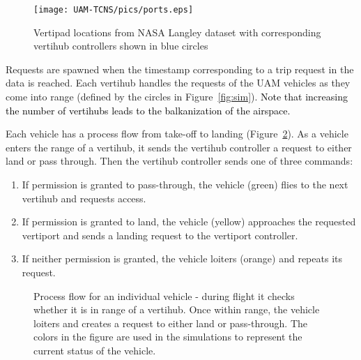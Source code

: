 \begin{figure}[h!]
	\centering
	\texttt{[image: UAM-TCNS/pics/ports.eps]}
	\caption{ Vertipad locations from NASA Langley dataset with corresponding vertihub controllers shown in blue circles}
	\label{fig:vertipadlocations}
\end{figure}


Requests are spawned when the timestamp corresponding to a trip request in the data is reached. Each vertihub handles the requests of the UAM vehicles as they come into range (defined by the circles in Figure~\ref{fig:sim}). \textcolor{black}{Note that increasing the number of vertihubs leads to the balkanization of the airspace.}



Each vehicle has a process flow from take-off to landing (Figure~\ref{fig:aircraftprocess}).
As a vehicle enters the range of a vertihub, it sends the vertihub controller a request to either land or pass through.
Then the vertihub controller sends one of three commands:
\begin{enumerate}
    \item If permission is granted to pass-through, the vehicle (green) flies to the next vertihub and requests access.
    \item If permission is granted to land, the vehicle (yellow) approaches the requested vertiport and sends a landing request to the vertiport controller.
    \item If neither permission is granted, the vehicle loiters (orange) and repeats its request.
 
\end{enumerate}

\begin{figure}
    \centering
    \scalebox{1}{}
    \caption[Process flow for an individual UAM moving through the environment.]{Process flow for an individual vehicle - during flight it checks whether it is in range of a vertihub. Once within range, the vehicle loiters and creates a request to either land or pass-through. The colors in the figure are used in the simulations to represent the current status of the vehicle.}
    \label{fig:aircraftprocess}
\end{figure}







